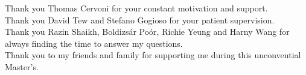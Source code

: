Thank you Thomas Cervoni for your constant motivation and support. \\
Thank you David Tew and Stefano Gogioso for your patient supervision. \\
Thank you Razin Shaikh, Boldizsár Poór, Richie Yeung and Harny Wang for always finding the time to answer my questions. \\
Thank you to my friends and family for supporting me during this unconvential Master's.
